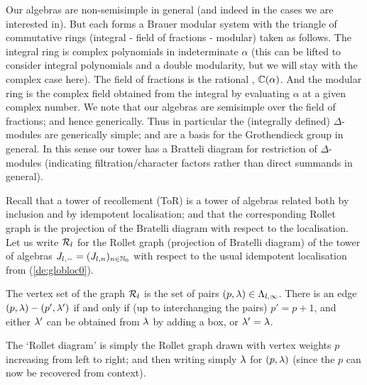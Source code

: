 \mdef  Our algebras are non-semisimple in general (and indeed in the cases we are interested in). But each forms a Brauer modular system with the triangle of commutative rings (integral - field of fractions - modular) taken as follows. 
The integral ring is complex polynomials in indeterminate $\alpha$ (this can be lifted to consider integral polynomials and a double modularity, but we will stay with the complex case here). The field of fractions is the rational , $\mathbb{C}(\alpha)$. 
And the modular ring is the complex field obtained from the integral by evaluating $\alpha$ at a given complex number. 
We note that our algebras are semisimple over the field of fractions; and hence generically. Thus in particular the (integrally defined) $\Delta$-modules are generically simple; and are a basis for the Grothendieck group in general. 
In this sense our tower has a Bratteli diagram for restriction of $\Delta$-modules 
(indicating filtration/character factors rather than direct summands in general). 


\mdef   \label{de:Rollet} 
Recall \cite{ToR} that a tower of recollement (ToR) is a tower of algebras related both by inclusion and by idempotent localisation; and that the corresponding Rollet graph is the projection of the Bratelli diagram  with respect to the localisation. 
Let us write ${\mathcal{R}}_{l}$ for the Rollet graph (projection of  Bratelli diagram)  of the tower of algebras $J_{l,-} = ( J_{l,n})_{n \in \mathbb{N}_0}$ with respect to the usual idempotent localisation from (\ref{de:globloc0}).

The vertex set of the graph ${\mathcal{R}}_l$ is the set of pairs $(p,\lambda)  \in \Lambda_{l,\infty}$. 
There is an edge $(p,\lambda)-(p', \lambda')$ if and only if (up to interchanging the pairs) $p'=p+1$, and either $\lambda'$ can be obtained from $\lambda$ by adding a box, or $\lambda'=\lambda$.




\medskip 

The `Rollet diagram' is simply the Rollet graph drawn with vertex weights 
$p$ %
increasing 
from left to right; and then writing simply $\lambda$ for $(p,\lambda)$ (since the $p$ can now be recovered from context). 

